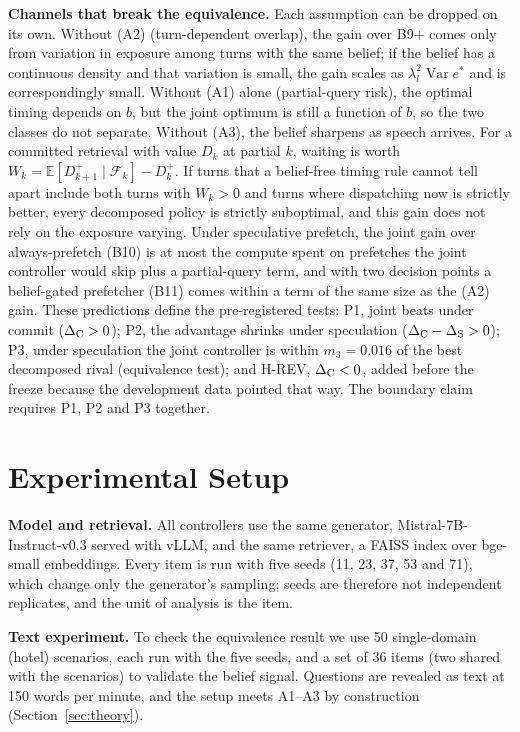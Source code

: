 \textbf{Channels that break the equivalence.} Each assumption can be dropped
on its own. Without (A2) (turn-dependent overlap), the gain over B9+ comes
only from variation in exposure among turns with the same belief; if the
belief has a continuous density and that variation is small, the gain scales
as $\lambda_l^{2}\operatorname{Var}e^{*}$ and is correspondingly small. Without (A1)
alone (partial-query risk), the optimal timing depends on $b$, but the joint
optimum is still a function of $b$, so the two classes do not separate.
Without (A3), the belief sharpens as speech arrives. For a committed
retrieval with value $D_k$ at partial $k$, waiting is worth
$W_k=\mathbb E[D_{k+1}^{+}\mid\mathcal F_k]-D_k^{+}$. If turns that a
belief-free timing rule cannot tell apart include both turns with $W_k>0$ and
turns where dispatching now is strictly better, every decomposed policy is
strictly suboptimal, and this gain does not rely on the exposure varying.
Under speculative prefetch, the joint gain over always-prefetch (B10) is at
most the compute spent on prefetches the joint controller would skip plus a
partial-query term, and with two decision points a belief-gated prefetcher
(B11) comes within a term of the same size as the (A2) gain. These
predictions define the pre-registered tests: P1, joint beats \Bplus{} under
commit ($\Delta_{\mathrm{C}}>0$); P2, the advantage shrinks under speculation
($\Delta_{\mathrm{C}}-\Delta_{\mathrm{S}}>0$); P3, under speculation the joint controller is within
$m_3=0.016$ of the best decomposed rival (equivalence test); and H-REV,
$\Delta_{\mathrm{C}}<0$, added before the freeze because the development data pointed that
way. The boundary claim requires P1, P2 and P3 together.

\section{Experimental Setup}\label{sec:setup}
\textbf{Model and retrieval.} All controllers use the same generator,
Mistral-7B-Instruct-v0.3 served with vLLM, and the same retriever, a FAISS
index over bge-small embeddings. Every item is run with five seeds (11, 23, 37,
53 and 71), which change only the generator's sampling; seeds are therefore
not independent replicates, and the unit of analysis is the item.

\textbf{Text experiment.} To check the equivalence result we use 50
single-domain (hotel) scenarios, each run with the five seeds, and a set of
36 items (two shared with the scenarios) to validate the belief signal.
Questions are revealed as text at 150 words per minute, and the setup meets
A1--A3 by construction (Section~\ref{sec:theory}).

